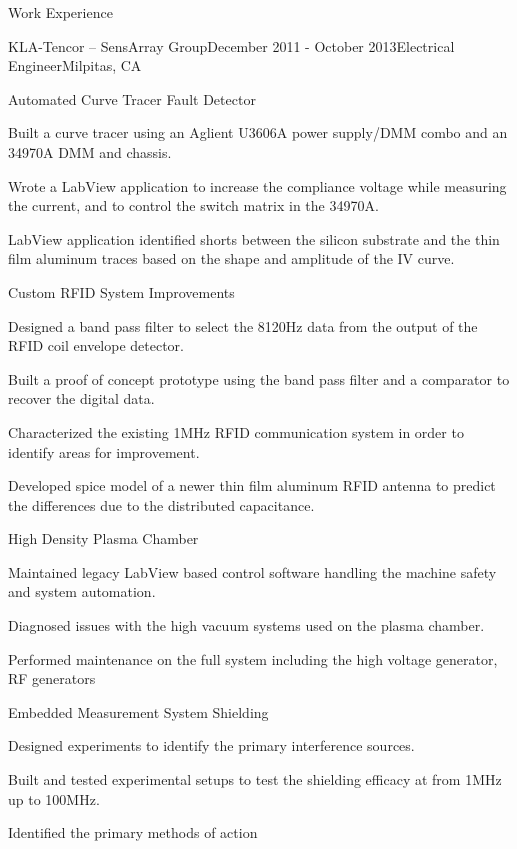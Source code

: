 \documentclass{resume} %
\begin{document}
\begin{rSection}{Work Experience}
\begin{rSubsection2}{KLA-Tencor -- SensArray Group}{December 2011 - October 2013}{Electrical Engineer}{Milpitas, CA}
\begin{rWorkProject}{Automated Curve Tracer Fault Detector}
\item Built a curve tracer using an Aglient U3606A power supply/DMM combo and an 34970A DMM and chassis.
\item Wrote a LabView application to increase the compliance voltage while measuring the current, and to control the switch matrix in the 34970A.
\item LabView application identified shorts between the silicon substrate and the thin film aluminum traces based on the shape and amplitude of the IV curve.
\end{rWorkProject}

\begin{rWorkProject}{Custom RFID System Improvements}
\item Designed a band pass filter to select the 8120Hz data from the output of the RFID coil envelope detector.
\item Built a proof of concept prototype using the band pass filter and a comparator to recover the digital data.
\item Characterized the existing 1MHz RFID communication system in order to identify areas for improvement.
\item Developed spice model of a newer thin film aluminum RFID antenna to predict the differences due to the distributed capacitance. 
\end{rWorkProject}

\begin{rWorkProject}{High Density Plasma Chamber}
\item Maintained legacy LabView based control software handling the machine safety and system automation.
\item Diagnosed issues with the high vacuum systems used on the plasma chamber.
\item Performed maintenance on the full system including the high voltage generator, RF generators 
\end{rWorkProject}

\begin{rWorkProject}{Embedded Measurement System Shielding}
\item Designed experiments to identify the primary interference sources.
\item Built and tested experimental setups to test the shielding efficacy at from 1MHz up to 100MHz.
\item Identified the primary methods of action 
\end{rWorkProject}


\end{rSubsection2}
\end{rSection}
\end{document}
